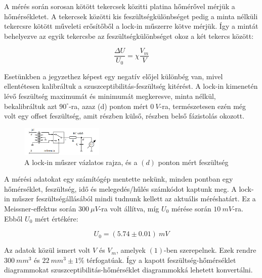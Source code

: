 \documentclass[a4paper,12pt]{article}
\begin{document}
\vspace{5mm}

\par A mérés során sorosan kötött tekercsek közitti platina hőmérővel mérjük a hőmérsékletet. A tekercsek közötti kis feszültségkülönbséget pedig a minta nélküli tekercsre kötött műveleti erősítőből a lock-in műszerre kötve mérjük. Így a mintát behelyezve az egyik tekercsbe az feszültségkülönbséget okoz a két tekercs között:

\begin{equation}
	\frac{\Delta U}{U_{0}} = \chi \frac{V_{m}}{V}
\end{equation} 

\par Esetünkben a jegyzethez képest egy negatív előjel különbég van, mivel ellentétesen kalibráltuk a szuszceptibilitás-feszültség kitérést. A lock-in kimenetén lévő feszültség maximumát és minimumát megkeresve, minta nélkül, bekalibráltuk azt $90^{\circ}$-ra, azaz (d) ponton mért $0 ~V$-ra, természetesen ezén még volt egy offset feszültség, amit részben külső, részben belső fázistolás okozott. 

\begin{figure}[!htb]
\centering
\includegraphics[width=0.35\textwidth]{./lockin.png}
\caption{A lock-in műszer vázlatos rajza, és a $(d)$ ponton mért feszültség}
\end{figure}

\par A mérési adatokat egy számítógép mentette nekünk, minden pontban egy hőmérséklet, feszültség, idő és melegedés/hűlés számkódot kaptunk meg. A lock-in műszer feszültségállásából mindi tudnunk kellett az aktuális méréshatárt. Ez a Meissner-effektus során $300 ~\mu V$-ra volt állítva, míg $U_{0}$ mérése során $10 ~mV$-ra. Ebből $U_{0}$ mért értékére:

\begin{equation}
U_{0} = (5.74 \pm 0.01) ~mV 
\end{equation}

\par Az adatok közül ismert volt $V$ és $V_{m}$, amelyek $(1)$-ben szerepelnek. Ezek rendre $300 ~mm^{3}$ és $22 ~mm^{3} \pm 1\%$ térfogatúak. Így a kapott feszültség-hőmérséklet diagrammokat szuszceptibilitás-hőmérséklet diagrammokká lehetett konvertálni.
\end{document}
